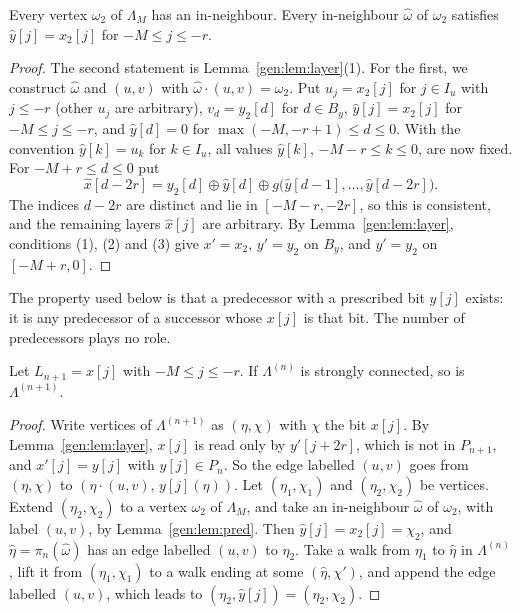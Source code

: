 \begin{lemma}[predecessors]\label{gen:lem:pred}
Every vertex $\omega_2$ of $\Lambda_M$ has an in-neighbour. Every in-neighbour $\hat\omega$ of $\omega_2$ satisfies $\hat y[j]=x_2[j]$ for $-M\le j\le-r$.
\end{lemma}

\begin{proof}
The second statement is Lemma~\ref{gen:lem:layer}(1). For the first, we construct $\hat\omega$ and $(u,v)$ with $\hat\omega\cdot(u,v)=\omega_2$. Put $u_j=x_2[j]$ for $j\in I_u$ with $j\le-r$ (other $u_j$ are arbitrary), $v_d=y_2[d]$ for $d\in B_y$, $\hat y[j]=x_2[j]$ for $-M\le j\le-r$, and $\hat y[d]=0$ for $\max(-M,-r+1)\le d\le0$. With the convention $\hat y[k]=u_k$ for $k\in I_u$, all values $\hat y[k]$, $-M-r\le k\le0$, are now fixed. For $-M+r\le d\le0$ put
\[
\hat x[d-2r]=y_2[d]\oplus\hat y[d]\oplus g\bigl(\hat y[d-1],\dots,\hat y[d-2r]\bigr).
\]
The indices $d-2r$ are distinct and lie in $[-M-r,-2r]$, so this is consistent, and the remaining layers $\hat x[j]$ are arbitrary. By Lemma~\ref{gen:lem:layer}, conditions (1), (2) and (3) give $x'=x_2$, $y'=y_2$ on $B_y$, and $y'=y_2$ on $[-M+r,0]$.
\end{proof}

The property used below is that a predecessor with a prescribed bit $y[j]$ exists: it is any predecessor of a successor whose $x[j]$ is that bit. The number of predecessors plays no role.

\begin{lemma}\label{gen:lem:xstep}
Let $L_{n+1}=x[j]$ with $-M\le j\le-r$. If $\Lambda^{(n)}$ is strongly connected, so is $\Lambda^{(n+1)}$.
\end{lemma}

\begin{proof}
Write vertices of $\Lambda^{(n+1)}$ as $(\eta,\chi)$ with $\chi$ the bit $x[j]$. By Lemma~\ref{gen:lem:layer}, $x[j]$ is read only by $y'[j+2r]$, which is not in $P_{n+1}$, and $x'[j]=y[j]$ with $y[j]\in P_n$. So the edge labelled $(u,v)$ goes from $(\eta,\chi)$ to $(\eta\cdot(u,v),\,y[j](\eta))$. Let $(\eta_1,\chi_1)$ and $(\eta_2,\chi_2)$ be vertices. Extend $(\eta_2,\chi_2)$ to a vertex $\omega_2$ of $\Lambda_M$, and take an in-neighbour $\hat\omega$ of $\omega_2$, with label $(u,v)$, by Lemma~\ref{gen:lem:pred}. Then $\hat y[j]=x_2[j]=\chi_2$, and $\hat\eta=\pi_n(\hat\omega)$ has an edge labelled $(u,v)$ to $\eta_2$. Take a walk from $\eta_1$ to $\hat\eta$ in $\Lambda^{(n)}$, lift it from $(\eta_1,\chi_1)$ to a walk ending at some $(\hat\eta,\chi')$, and append the edge labelled $(u,v)$, which leads to $(\eta_2,\hat y[j])=(\eta_2,\chi_2)$.
\end{proof}

